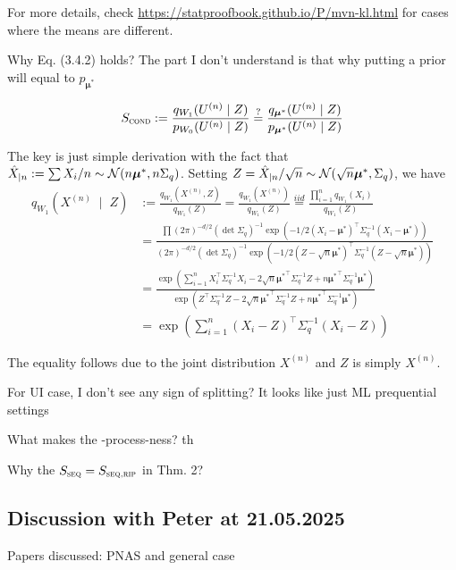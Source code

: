 For more details, check \url{https://statproofbook.github.io/P/mvn-kl.html} for cases where the means are different.

Why Eq. (3.4.2) holds? The part I don't understand is that 
why putting a prior will equal to $p_{\bm{\mu}^*}$

\begin{align*}
    S_{\textsc{cond}} := \frac{q_{W_1}(U^{(n)} \;|\; Z)}{p_{W_0}(U^{(n)} \;|\; Z)}
    \stackrel{?}{=} \frac{q_{\bm{\mu}^*}(U^{(n)} \;|\; Z)}{p_{\bm{\mu}^*}(U^{(n)} \;|\; Z)}
\end{align*}

The key is just simple derivation with the fact that $\hat{X}_{|n}:=\sum X_i/n \sim \mathcal{N}(n\bm{\mu}^*,n\Sigma_q)$.
Setting $Z=\hat{X}_{|n}/\sqrt{n} \sim \mathcal{N}(\sqrt{n}\bm{\mu}^*,\Sigma_q)$, we have
\begin{align*}
    q_{W_1}(X^{(n)} \;\mid\; Z) &:= \frac{q_{W_1}(X^{(n)}, Z)}{q_{W_1}(Z)} = \frac{q_{W_1}(X^{(n)})}{q_{W_1}(Z)} 
    \stackrel{iid}{=} \frac{\prod^n_{i=1}q_{W_1}(X_i)}{q_{W_1}(Z)}\\
    &= \frac{\prod(2\pi)^{-d/2}(\det \Sigma_q)^{-1} \exp(-1/2 (X_i-\bm{\mu}^*)^\top \Sigma_q^{-1} (X_i - \bm{\mu}^*))}
    {(2\pi)^{-d/2}(\det \Sigma_q)^{-1} \exp(-1/2(Z -\sqrt{n} \bm{\mu}^*)^\top \Sigma_q^{-1} (Z -\sqrt{n} \bm{\mu}^*))}\\
    &= \frac{\exp(\sum_{i=1}^n X_i^\top\Sigma_q^{-1}X_i - 2 \sqrt{n}{\bm{\mu}^*}^\top\Sigma_q^{-1}Z 
    + n {\bm{\mu}^*}^\top \Sigma_q^{-1}\bm{\mu}^*)}
    {\exp(Z^\top\Sigma_q^{-1}Z - 2 \sqrt{n}{\bm{\mu}^*}^\top\Sigma_q^{-1}Z 
    + n {\bm{\mu}^*}^\top \Sigma_q^{-1}\bm{\mu}^*)} \\
    &= \exp(\sum_{i=1}^n (X_i - Z)^\top \Sigma_q^{-1} (X_i - Z))
\end{align*}

The equality follows due to the joint distribution $X^{(n)}$ and $Z$ is simply $X^{(n)}$.

For UI case, I don't see any sign of splitting? It looks like just ML prequential settings

What makes the \E-process-ness? th

Why the $S_{\textsc{seq}} = S_{\textsc{seq,rip}}$ in Thm. 2?

\subsection{Discussion with Peter at 21.05.2025}

Papers discussed: PNAS and general case


